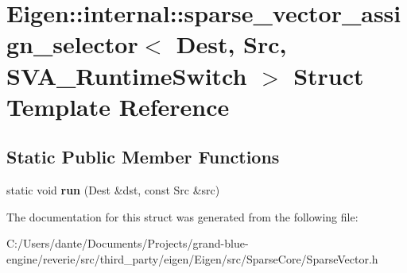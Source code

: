 \hypertarget{struct_eigen_1_1internal_1_1sparse__vector__assign__selector_3_01_dest_00_01_src_00_01_s_v_a___runtime_switch_01_4}{}\section{Eigen\+::internal\+::sparse\+\_\+vector\+\_\+assign\+\_\+selector$<$ Dest, Src, S\+V\+A\+\_\+\+Runtime\+Switch $>$ Struct Template Reference}
\label{struct_eigen_1_1internal_1_1sparse__vector__assign__selector_3_01_dest_00_01_src_00_01_s_v_a___runtime_switch_01_4}
\subsection*{Static Public Member Functions}
\begin{DoxyCompactItemize}
\item 
\mbox{\label{struct_eigen_1_1internal_1_1sparse__vector__assign__selector_3_01_dest_00_01_src_00_01_s_v_a___runtime_switch_01_4_a34ad8123f3a0ebf71a1c2a1e97eb3d34}} 
static void {\bfseries run} (Dest \&dst, const Src \&src)
\end{DoxyCompactItemize}


The documentation for this struct was generated from the following file\+:\begin{DoxyCompactItemize}
\item 
C\+:/\+Users/dante/\+Documents/\+Projects/grand-\/blue-\/engine/reverie/src/third\+\_\+party/eigen/\+Eigen/src/\+Sparse\+Core/Sparse\+Vector.\+h\end{DoxyCompactItemize}
